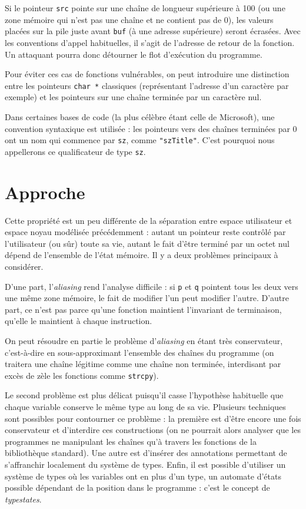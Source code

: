 
Si le pointeur \texttt{src} pointe sur une chaîne de longueur supérieure à 100
(ou une zone mémoire qui n'est pas une chaîne et ne contient pas de 0), les
valeurs placées sur la pile juste avant \texttt{buf} (à une adresse supérieure)
seront écrasées. Avec les conventions d'appel habituelles, il s'agit de
l'adresse de retour de la fonction. Un attaquant pourra donc détourner le flot
d'exécution du programme.

Pour éviter ces cas de fonctions vulnérables, on peut introduire une distinction
entre les pointeurs \texttt{char *} classiques (représentant l'adresse d'un
caractère par exemple) et les pointeurs sur une chaîne terminée par un caractère
nul.

Dans certaines bases de code (la plus célèbre étant celle de Microsoft), une
convention syntaxique est utilisée : les pointeurs vers des chaînes terminées
par 0 ont un nom qui commence par \texttt{sz}, comme \texttt{"szTitle"}. C'est
pourquoi nous appellerons ce qualificateur de type \texttt{sz}.

\section{Approche}

Cette propriété est un peu différente de la séparation entre espace utilisateur
et espace noyau modélisée précédemment : autant un pointeur reste contrôlé par
l'utilisateur (ou sûr) toute sa vie, autant le fait d'être terminé par un octet
nul dépend de l'ensemble de l'état mémoire. Il y a deux problèmes principaux à
considérer.

D'une part, l'\emph{aliasing} rend l'analyse difficile : si \texttt{p} et
\texttt{q} pointent tous les deux vers une même zone mémoire, le fait de
modifier l'un peut modifier l'autre. D'autre part, ce n'est pas parce qu'une
fonction maintient l'invariant de terminaison, qu'elle le maintient à chaque
instruction.

On peut résoudre en partie le problème d'\emph{aliasing} en étant très
conservateur, c'est-à-dire en sous-approximant l'ensemble des chaînes du
programme (on traitera une chaîne légitime comme une chaîne non terminée,
interdisant par excès de zèle les fonctions comme \texttt{strcpy}).

Le second problème est plus délicat puisqu'il casse l'hypothèse habituelle que
chaque variable conserve le même type au long de sa vie. Plusieurs techniques
sont possibles pour contourner ce problème : la première est d'être encore une
fois conservateur et d'interdire ces constructions (on ne pourrait alors
analyser que les programmes ne manipulant les chaînes qu'à travers les fonctions
de la bibliothèque standard). Une autre est d'insérer des annotations permettant
de s'affranchir localement du système de types. Enfin, il est possible
d'utiliser un système de types où les variables ont en plus d'un type, un
automate d'états possible dépendant de la position dans le programme : c'est le
concept de \emph{typestates}\cite{tse12-typestate}.

